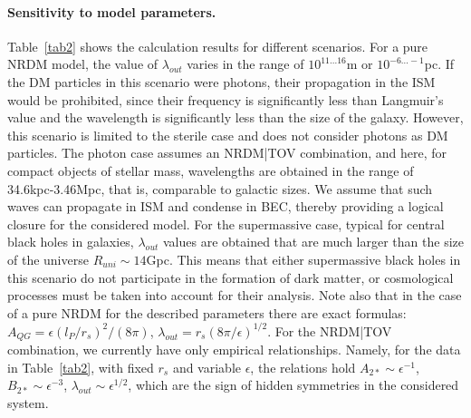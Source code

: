 \documentclass{article}
\begin{document}
\paragraph* {Sensitivity to model parameters.} Table~\ref {tab2} shows the calculation results for different scenarios. For a pure NRDM model, the value of $ \lambda_ {out} $ varies in the range of $ 10 ^ {11 ... 16} $m or $ 10 ^ {- 6 ...- 1} $pc. If the DM particles in this scenario were photons, their propagation in the ISM would be prohibited, since their frequency is significantly less than Langmuir's value and the wavelength is significantly less than the size of the galaxy. However, this scenario is limited to the sterile case and does not consider photons as DM particles. The photon case assumes an NRDM|TOV combination, and here, for compact objects of stellar mass, wavelengths are obtained in the range of 34.6kpc-3.46Mpc, that is, comparable to galactic sizes. We assume that such waves can propagate in ISM and condense in BEC, thereby providing a logical closure for the considered model. For the supermassive case, typical for central black holes in galaxies, $ \lambda_ {out} $ values are obtained that are much larger than the size of the universe $ R_ {uni} \sim14 $Gpc. This means that either supermassive black holes in this scenario do not participate in the formation of dark matter, or cosmological processes must be taken into account for their analysis. Note also that in the case of a pure NRDM for the described parameters there are exact formulas: $ A_ {QG} = \epsilon (l_P / r_s) ^ 2 / (8 \pi) $, $ \lambda_ {out} = r_s (8 \pi / \epsilon) ^ {1/2} $. For the NRDM|TOV combination, we currently have only empirical relationships. Namely, for the data in Table~\ref {tab2}, with fixed $ r_s $ and variable $ \epsilon $, the relations hold $ A_ {2 *} \sim \epsilon ^ {- 1} $, $ B_ {2 *} \sim \epsilon ^ {- 3} $, $ \lambda_ {out} \sim \epsilon ^ {1/2} $, which are the sign of hidden symmetries in the considered system.
\end{document}
